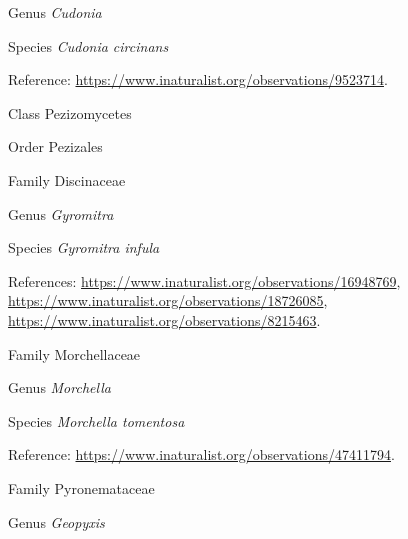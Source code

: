 \documentclass[9pt, article]{memoir}
\begin{document}
\begin{multicols}{2}
\vspace{6pt}\noindent\hspace{30pt}Genus \textit{Cudonia}


\vspace{6pt}\noindent\hspace{36pt}Species \textit{Cudonia circinans}


\vspace{6pt}Reference: 
\url{https://www.inaturalist.org/observations/9523714}.

\vspace{6pt}\noindent\hspace{12pt}Class Pezizomycetes


\vspace{6pt}\noindent\hspace{18pt}Order Pezizales


\vspace{6pt}\noindent\hspace{24pt}Family Discinaceae


\vspace{6pt}\noindent\hspace{30pt}Genus \textit{Gyromitra}


\vspace{6pt}\noindent\hspace{36pt}Species \textit{Gyromitra infula}


\vspace{6pt}References: 
\url{https://www.inaturalist.org/observations/16948769}, 
\url{https://www.inaturalist.org/observations/18726085}, 
\url{https://www.inaturalist.org/observations/8215463}.

\vspace{6pt}\noindent\hspace{24pt}Family Morchellaceae


\vspace{6pt}\noindent\hspace{30pt}Genus \textit{Morchella}


\vspace{6pt}\noindent\hspace{36pt}Species \textit{Morchella tomentosa}


\vspace{6pt}Reference: 
\url{https://www.inaturalist.org/observations/47411794}.

\vspace{6pt}\noindent\hspace{24pt}Family Pyronemataceae


\vspace{6pt}\noindent\hspace{30pt}Genus \textit{Geopyxis}



\end{multicols}
\end{document}
